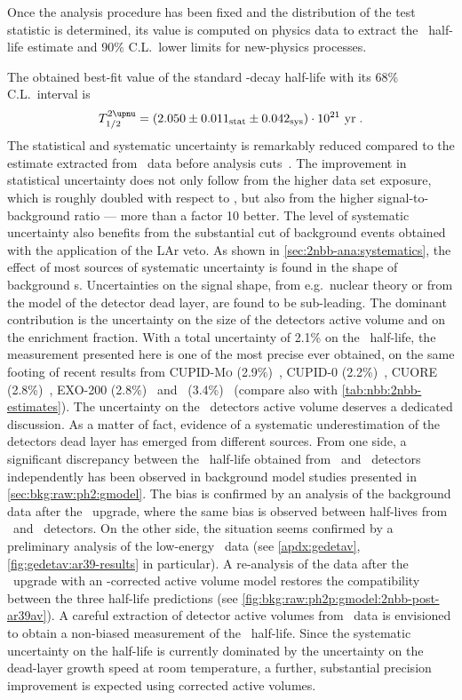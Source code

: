 Once the analysis procedure has been fixed and the distribution of the test statistic is
determined, its value is computed on physics data to extract the \nnbb\ half-life estimate
and 90\% C.L.~lower limits for new-physics processes.

The obtained best-fit value of the standard \nnbb-decay half-life with its 68\%
C.L.~interval is
\[
  \thalftwoM = \thalftwovalue~\text{yr} \;.
\]
The statistical and systematic uncertainty is remarkably reduced compared to the estimate
extracted from \phaseone\ data before analysis cuts~\cite{Agostini2015a}. The improvement
in statistical uncertainty does not only follow from the higher data set exposure,
which is roughly doubled with respect to \phaseone, but also from the higher
signal-to-background ratio --- more than a factor 10 better. The level of systematic
uncertainty also benefits from the substantial cut of background events obtained with the
application of the LAr veto. As shown in \cref{sec:2nbb-ana:systematics}, the effect of
most sources of systematic uncertainty is found in the shape of background \pdf{}s.
Uncertainties on the signal shape, from e.g.~nuclear theory or from the model of the detector dead
layer, are found to be sub-leading. The dominant contribution is the uncertainty on the
size of the detectors active volume and on the enrichment fraction. With a total
uncertainty of 2.1\% on the \nnbb\ half-life, the measurement presented here is
one of the most precise ever obtained, on the same footing of recent results from
\textsc{CUPID-Mo} (2.9\%)~\cite{Armengaud2019}, CUPID-0 (2.2\%)~\cite{Azzolini2019a},
CUORE (2.8\%)~\cite{Caminata2019}, EXO-200 (2.8\%)~\cite{Albert2013} and \kamlandzen\
(3.4\%)~\cite{Gando2019} (compare also with \cref{tab:nbb:2nbb-estimates}).
\newpar
The uncertainty on the \bege\ detectors active volume deserves a dedicated discussion.
As a matter of fact, evidence of a systematic underestimation of the detectors dead layer
has emerged from different sources. From one side, a significant discrepancy between the
\nnbb\ half-life obtained from \scoax\ and \bege\ detectors independently has been
observed in background model studies presented in \cref{sec:bkg:raw:ph2:gmodel}. The bias
is confirmed by an analysis of the background data after the \phasetwop\ upgrade, where
the same bias is observed between half-lives from \bege\ and \icoax\ detectors. On the
other side, the situation seems confirmed by a preliminary analysis of the low-energy
\Arl\ data (see \cref{apdx:gedetav}, \cref{fig:gedetav:ar39-results} in particular). A
re-analysis of the data after the \phasetwop\ upgrade with an \Arl-corrected active
volume model restores the compatibility between the three half-life predictions (see
\cref{fig:bkg:raw:ph2p:gmodel:2nbb-post-ar39av}). A careful extraction of detector active
volumes from \Arl\ data is envisioned to obtain a non-biased measurement of the \nnbb\
half-life. Since the systematic uncertainty on the half-life is currently dominated by the
uncertainty on the dead-layer growth speed at room temperature, a further, substantial
precision improvement is expected using corrected active volumes.


